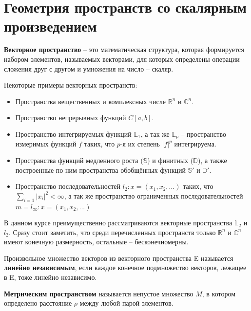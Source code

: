 \documentclass[12pt]{article}
\begin{document}
\section{Геометрия пространств со скалярным произведением}


	\begin{defi} 
		\textbf{Векторное пространство} -- это математическая структура, которая формируется набором элементов, называемых векторами, для 
		которых определены операции сложения друг с другом и умножения на число -- скаляр.
	\end{defi}

	Некоторые примеры векторных пространств:
		\begin{itemize}
			\item Пространства вещественных и комплексных числе $\mathbb{R}^n$ и $\mathbb{C}^n$.
			\item Пространство непрерывных функций $C[a,b]$.
			\item Пространство интегрируемых функций $\mathbb{L}_1$, а так же $\mathbb{L}_p$ -- пространство измеримых 
			функций $f$ таких, что $p$-я их степень $|f|^p$ интегрируема.
			\item Пространства функций медленного роста ($\mathbb{S}$) и финитных ($\mathbb{D}$), а также построенные по ним пространства 
			обобщённых функций $\mathbb{S}'$ и $\mathbb{D}'$.
			\item Пространство последовательностей $l_2 : x = (x_1, x_2, ...)$ таких, что $\sum_{i=1} |x_i|^2 < \infty$, а так же 
			пространство ограниченных последовательностей $m = l_\infty : x = (x_1, x_2, ...)$
		\end{itemize}

	В данном курсе преимущественно рассматриваются векторные пространства $\mathbb{L}_2$ и $l_2$. Сразу стоит заметить, что 
	среди перечисленных пространств только $\mathbb{R}^n$ и $\mathbb{C}^n$ имеют конечную размерность, остальные -- бесконечномерны.
	
	\begin{defi}
		Произвольное множество векторов из векторного пространства E называется \textbf{линейно независимым}, если каждое конечное
		подмножество векторов, лежащее в E, тоже линейно независимо.
	\end{defi}
	
	\begin{defi}
		\textbf{Метрическим пространством} называется непустое множество $M$,
		в котором определено расстояние $\rho$ между любой парой элементов. 
	\end{defi}
	
\end{document}

